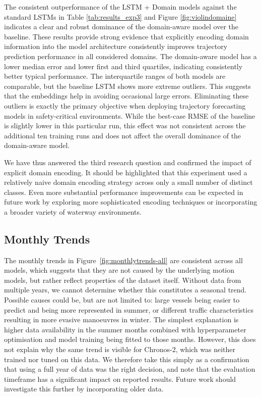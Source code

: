 The consistent outperformance of the LSTM + Domain models against the standard \acp{LSTM} in Table \ref{tab:results_exp3} and Figure \ref{fig:violindomaine} indicates a clear and robust dominance of the domain-aware model over the baseline.
These results provide strong evidence that explicitly encoding domain information into the model architecture consistently improves trajectory prediction performance in all considered domains.
The domain-aware model has a lower median error and lower first and third quartiles, indicating consistently better typical performance. The interquartile ranges of both models are comparable, but the baseline \ac{LSTM} shows more extreme outliers. This suggests that the embeddings help in avoiding occasional large errors. Eliminating these outliers is exactly the primary objective when deploying trajectory forecasting models in safety-critical environments.
While the best-case \acs{RMSE} of the baseline is slightly lower in this particular run, this effect was not consistent across the additional ten training runs and does not affect the overall dominance of the domain-aware model. 

We have thus answered the third research question and confirmed the impact of explicit domain encoding.
It should be highlighted that this experiment used a relatively naive domain encoding strategy across only a small number of distinct classes. Even more substantial performance improvements can be expected in future work by exploring more sophisticated encoding techniques or incorporating a broader variety of waterway environments. %

\subsection*{Monthly Trends} 

The monthly trends in Figure~\ref{fig:monthlytrends-all} are consistent across all models, which suggests that they are not caused by the underlying motion models, but rather reflect properties of the dataset itself.
Without data from multiple years, we cannot determine whether this constitutes a seasonal trend. Possible causes could be, but are not limited to: large vessels being easier to predict and being more represented in summer, or different traffic characteristics resulting in more evasive manoeuvres in winter.
The simplest explanation is higher data availability in the summer months combined with hyperparameter optimisation and model training being fitted to those months.
However, this does not explain why the same trend is visible for Chronos-2, which was neither trained nor tuned on this data.
We therefore take this simply as a confirmation that using a full year of data was the right decision, and note that the evaluation timeframe has a significant impact on reported results. Future work should investigate this further by incorporating older data.

